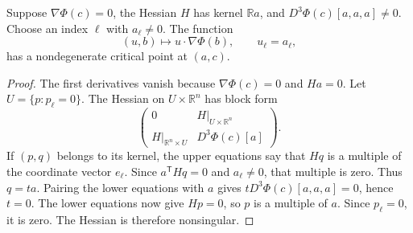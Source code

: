 \documentclass[11pt]{article}
\begin{document}
\begin{lemma}
Suppose $\nabla\Phi(c)=0$, the Hessian $H$ has kernel
$\mathbb R a$, and $D^3\Phi(c)[a,a,a]\neq0$. Choose an index $\ell$
with $a_\ell\neq0$. The function
\[
 (u,b)\longmapsto u\cdot\nabla\Phi(b),\qquad u_\ell=a_\ell,
\]
has a nondegenerate critical point at $(a,c)$.
\end{lemma}
\begin{proof}
The first derivatives vanish because $\nabla\Phi(c)=0$ and $Ha=0$.
Let $U=\{p:p_\ell=0\}$. The Hessian on $U\times\mathbb R^n$ has
block form
\[
 \begin{pmatrix}0&H|_{U\times\mathbb R^n}\\
 H|_{\mathbb R^n\times U}&D^3\Phi(c)[a]\end{pmatrix}.
\]
If $(p,q)$ belongs to its kernel, the upper equations say that
$Hq$ is a multiple of the coordinate vector $e_\ell$.
Since $a^{\mathsf T}Hq=0$ and $a_\ell\neq0$, that multiple is zero.
Thus $q=ta$. Pairing the lower equations with $a$ gives
$tD^3\Phi(c)[a,a,a]=0$, hence $t=0$. The lower equations now give
$Hp=0$, so $p$ is a multiple of $a$. Since $p_\ell=0$, it is zero.
The Hessian is therefore nonsingular.
\end{proof}
\end{document}
